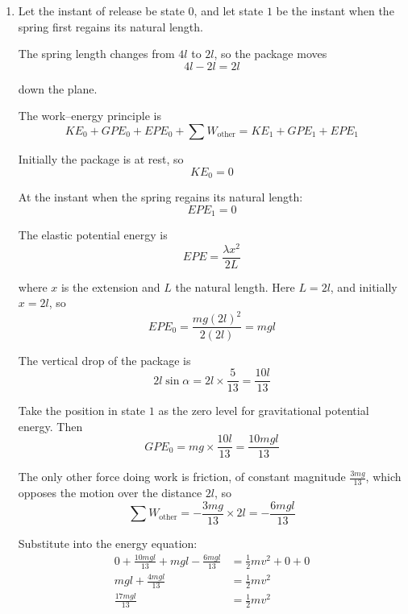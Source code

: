 \documentclass[leqno]{article}
\begin{document}
\begin{enumerate}[
  label=\textbf{\arabic*.},
  leftmargin=*,
  topsep=0pt,
  partopsep=0pt,
  parsep=0pt
]
\begin{djsSolution}
\begin{enumerate}[label=\textbf{(\alph*)}, start=1]
  The component of the weight down the plane is
  \[
  mg\sin\alpha=mg\times\frac{5}{13}=\frac{5mg}{13}
  \]

  Therefore the resultant force down the plane is
  \begin{align*}
  T+mg\sin\alpha-F
  &=mg+\frac{5mg}{13}-\frac{3mg}{13}\\
  &=mg+\frac{2mg}{13}\\
  &=\frac{15mg}{13}
  \end{align*}

  Using Newton's second law:
  \[
  ma=\frac{15mg}{13}
  \]

  so
  \[
  a=\frac{15}{13}g
  \]

  Therefore the acceleration is $\frac{15}{13}g$ down the plane.

  \item Let the instant of release be state $0$, and let state $1$ be the instant when the spring first regains its natural length.

  The spring length changes from $4l$ to $2l$, so the package moves
  \[
  4l-2l=2l
  \]

  down the plane.

  The work--energy principle is
  \[
  KE_0+GPE_0+EPE_0+\sum W_{\text{other}}=KE_1+GPE_1+EPE_1
  \]

  Initially the package is at rest, so
  \[
  KE_0=0
  \]

  At the instant when the spring regains its natural length:
  \[
  EPE_1=0
  \]

  The elastic potential energy is
  \[
  EPE=\frac{\lambda x^2}{2L}
  \]

  where \(x\) is the extension and \(L\) the natural length. Here \(L=2l\), and initially \(x=2l\), so
  \[
  EPE_0=\frac{mg(2l)^2}{2(2l)}=mgl
  \]

  The vertical drop of the package is
  \[
  2l\sin\alpha=2l\times\frac{5}{13}=\frac{10l}{13}
  \]

  Take the position in state $1$ as the zero level for gravitational potential energy. Then
  \[
  GPE_0=mg\times\frac{10l}{13}=\frac{10mgl}{13}
  \]

  The only other force doing work is friction, of constant magnitude \(\frac{3mg}{13}\), which opposes the motion over the distance $2l$, so
  \[
  \sum W_{\text{other}}=-\frac{3mg}{13}\times 2l=-\frac{6mgl}{13}
  \]

  Substitute into the energy equation:
  \begin{align*}
  0+\frac{10mgl}{13}+mgl-\frac{6mgl}{13}
  &=\frac12 mv^2+0+0\\
  mgl+\frac{4mgl}{13}
  &=\frac12 mv^2\\
  \frac{17mgl}{13}
  &=\frac12 mv^2
  \end{align*}


\end{enumerate}
\end{djsSolution}
\end{enumerate}
\end{document}
